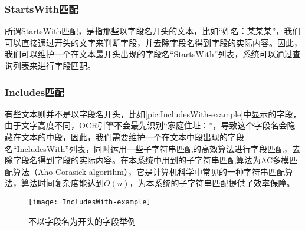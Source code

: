 \subsubsection*{StartsWith匹配}
所谓StartsWith匹配，是指那些以字段名开头的文本，比如“姓名：某某某”，我们可以直接通过开头的文字来判断字段，并去除字段名得到字段的实际内容。因此，我们可以维护一个在文本最开头出现的字段名“StartsWith”列表，系统可以通过查询列表来进行字段匹配。
\subsubsection*{Includes匹配}
有些文本则并不是以字段名开头，比如\autoref{pic:IncludesWith-example}中显示的字段，由于文字高度不同，OCR引擎不会最先识别“家庭住址：”，导致这个字段名会隐藏在文本的中段，因此，我们需要维护一个在文本中段出现的字段名“IncludesWith”列表，同时运用一些子字符串匹配的高效算法进行字段匹配，去除字段名得到字段的实际内容。在本系统中用到的子字符串匹配算法为AC多模匹配算法（Aho-Corasick algorithm）\citep{aho1975efficient}，它是计算机科学中常见的一种字符串匹配算法，算法时间复杂度能达到$O(n)$，为本系统的子字符串匹配提供了效率保障。
\begin{figure}
	\centering
	\caption{不以字段名为开头的字段举例}
	\texttt{[image: IncludesWith-example]}
	\label{pic:IncludesWith-example}
\end{figure}


